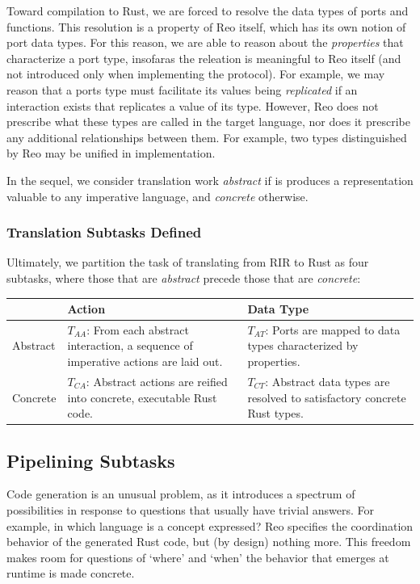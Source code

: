 Toward compilation to Rust, we are forced to resolve the data types of ports and functions. This resolution is a property of Reo itself, which has its own notion of port data types. For this reason, we are able to reason about the \textit{properties} that characterize a port type, insofaras the releation is meaningful to Reo itself (and not introduced only when implementing the protocol). For example, we may reason that a ports type must facilitate its values being \textit{replicated} if an interaction exists that replicates a value of its type. However, Reo does not prescribe what these types are called in the target language, nor does it prescribe any additional relationships between them. For example, two types distinguished by Reo may be unified in implementation. 

In the sequel, we consider translation work \textit{abstract} if is produces a representation valuable to any imperative language, and \textit{concrete} otherwise.


\subsubsection{Translation Subtasks Defined}

Ultimately, we partition the task of translating from RIR to Rust as four subtasks, where those that are \textit{abstract} precede those that are \textit{concrete}:

\begin{tabular}{l|p{5cm}p{5cm}}
	& Action & Data Type \\
	\hline
	Abstract & $T_{AA}$: From each abstract interaction, a sequence of imperative actions are laid out. & $T_{AT}$: Ports are mapped to data types characterized by properties. \\
	\hline
	Concrete & $T_{CA}$: Abstract actions are reified into concrete, executable Rust code. & $T_{CT}$: Abstract data types are resolved to satisfactory concrete Rust types.
\end{tabular}


\subsection{Pipelining Subtasks}
\label{sec:decoupling_reo_rust}

Code generation is an unusual problem, as it introduces a spectrum of possibilities in response to questions that usually have trivial answers. For example, in which language is a concept expressed? Reo specifies the coordination behavior of the generated Rust code, but (by design) nothing more. This freedom makes room for questions of `where' and `when' the behavior that emerges at runtime is made concrete. 

